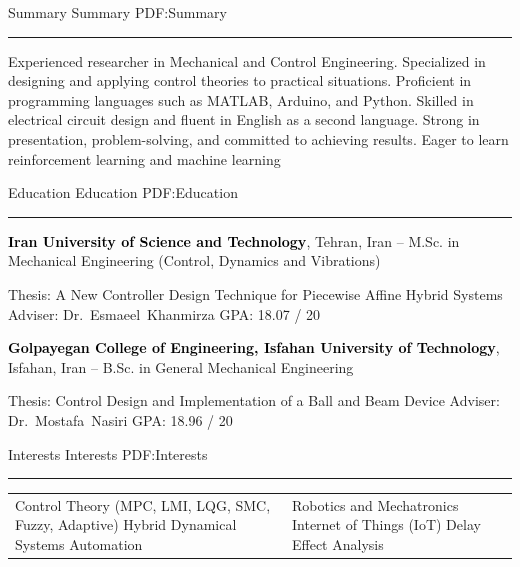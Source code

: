 \documentclass[letterpaper,MMMyyyy]{CVTemplate}
\begin{document}
\begin{Body}

\Section
{Summary}
{Summary}
{PDF:Summary}
\textcolor{Forestg}{\vspace{0.10cm}\hrule height 0.1cm}\BigGap\Gap
\Entry
\BulletItem Experienced researcher in Mechanical and Control Engineering.
\BulletItem Specialized in designing and applying control theories to practical situations.
\BulletItem Proficient in programming languages such as MATLAB, Arduino, and Python.
\BulletItem Skilled in electrical circuit design and fluent in English as a second language.
\BulletItem Strong in presentation, problem-solving, and committed to achieving results.
\BulletItem Eager to learn reinforcement learning and machine learning

\Section
{Education}
{Education}
{PDF:Education}
\textcolor{Forestg}{\vspace{0.10cm}\hrule height 0.1cm}\BigGap\Gap
\Entry
{\textcolor{black}{\textbf{Iran University of Science and Technology}}, Tehran, Iran}
\hfill
{\textcolor{OrangeY}{ --
	}}
\Gap
\BulletItem
M.Sc. in
{Mechanical Engineering \small{(Control, Dynamics and Vibrations)}}

\begin{Detail}
\SubBulletItem
Thesis:
{A New Controller Design Technique for Piecewise Affine Hybrid Systems}
\SubBulletItem
Adviser:
Dr.~Esmaeel~Khanmirza
\SubBulletItem
GPA: 18.07 / 20
\end{Detail}


\BigGap
\Entry
{\textcolor{black}{\textbf{Golpayegan College of Engineering, Isfahan University of Technology}},
Isfahan, Iran}
\hfill
\textcolor{OrangeY}{ --
}
\Gap
\BulletItem
B.Sc. in
{General Mechanical Engineering}

\begin{Detail}
\SubBulletItem
Thesis: Control Design and Implementation of a Ball and Beam Device
\SubBulletItem
Adviser:
Dr.~Mostafa~Nasiri
\SubBulletItem
GPA: 18.96 / 20
\end{Detail}



\Section
{Interests}
{Interests}
{PDF:Interests}
\textcolor{Forestg}{\vspace{0.10cm}\hrule height 0.1cm}\BigGap\Gap
\Entry

\begin{center}
	\begin{tabular}{ m{8cm} m{8cm} }
		\BulletItem
		Control Theory
		\scriptsize{(MPC, LMI, LQG, SMC, Fuzzy, Adaptive)}
		\normalsize
		\BulletItem
		Hybrid Dynamical Systems
		\BulletItem
		Automation
		 & \BulletItem
		Robotics and Mechatronics
		\BulletItem
		Internet of Things (IoT)
		\BulletItem
		Delay Effect Analysis
	\end{tabular}
\end{center}
\vspace{6pt}



\end{Body}
\end{document}
